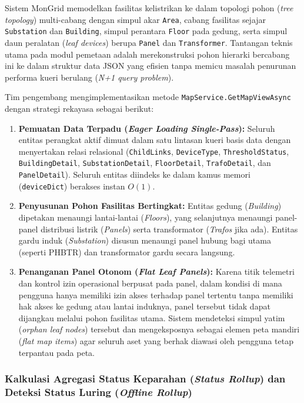 Sistem MonGrid memodelkan fasilitas kelistrikan ke dalam topologi pohon (\textit{tree topology}) multi-cabang dengan simpul akar \texttt{Area}, cabang fasilitas sejajar \texttt{Substation} dan \texttt{Building}, simpul perantara \texttt{Floor} pada gedung, serta simpul daun peralatan (\textit{leaf devices}) berupa \texttt{Panel} dan \texttt{Transformer}. Tantangan teknis utama pada modul pemetaan adalah merekonstruksi pohon hierarki bercabang ini ke dalam struktur data JSON yang efisien tanpa memicu masalah penurunan performa kueri berulang (\textit{N+1 query problem}).

Tim pengembang mengimplementasikan metode \texttt{MapService.GetMapViewAsync} dengan strategi rekayasa sebagai berikut:
\begin{enumerate}[label=\arabic*., leftmargin=*, itemsep=0pt]
  \item \textbf{Pemuatan Data Terpadu (\textit{Eager Loading Single-Pass}):} Seluruh entitas perangkat aktif dimuat dalam satu lintasan kueri basis data dengan menyertakan relasi relasional (\texttt{ChildLinks}, \texttt{DeviceType}, \texttt{ThresholdStatus}, \texttt{BuildingDetail}, \texttt{SubstationDetail}, \texttt{FloorDetail}, \texttt{TrafoDetail}, dan \texttt{PanelDetail}). Seluruh entitas diindeks ke dalam kamus memori (\texttt{deviceDict}) berakses instan $O(1)$.
  \item \textbf{Penyusunan Pohon Fasilitas Bertingkat:} Entitas gedung (\textit{Building}) dipetakan menaungi lantai-lantai (\textit{Floors}), yang selanjutnya menaungi panel-panel distribusi listrik (\textit{Panels}) serta transformator (\textit{Trafos} jika ada). Entitas gardu induk (\textit{Substation}) disusun menaungi panel hubung bagi utama (seperti PHBTR) dan transformator gardu secara langsung.
  \item \textbf{Penanganan Panel Otonom (\textit{Flat Leaf Panels}):} Karena titik telemetri dan kontrol izin operasional berpusat pada panel, dalam kondisi di mana pengguna hanya memiliki izin akses terhadap panel tertentu tanpa memiliki hak akses ke gedung atau lantai induknya, panel tersebut tidak dapat dijangkau melalui pohon fasilitas utama. Sistem mendeteksi simpul yatim (\textit{orphan leaf nodes}) tersebut dan mengeksposnya sebagai elemen peta mandiri (\textit{flat map items}) agar seluruh aset yang berhak diawasi oleh pengguna tetap terpantau pada peta.
\end{enumerate}

\subsubsection{Kalkulasi Agregasi Status Keparahan (\textit{Status Rollup}) dan Deteksi Status Luring (\textit{Offline Rollup})}

